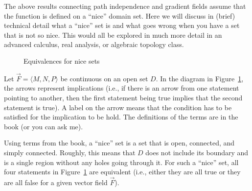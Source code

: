 The above results connecting path independence and gradient fields assume that the function is defined on a ``nice'' domain set.  Here we will discuss in (brief) technical detail what a ``nice'' set is and what goes wrong when you have a set that is not so nice.  This would all be explored in much more detail in an advanced calculus, real analysis, or algebraic topology class.

\begin{figure}[h]
  \centering
  \caption{Equivalences for nice sets}
  \label{fig:equivalences}
\end{figure}


Let $\vec F=\langle M,N,P\rangle$ be continuous on an open set $D$.
In the diagram in Figure~\ref{fig:equivalences}, the arrows represent
implications (i.e., if there is an arrow from one statement pointing
to another, then the first statement being true implies that the
second statement is true).  A label on the arrow means that the
condition has to be satisfied for the implication to be hold.  The
definitions of the terms are in the book (or you can ask me).



Using terms from the book, a ``nice'' set is a set that is open,
connected, and simply connected.  Roughly, this means that $D$ does
not include its boundary and is a single region without any holes going
through it.  For such a ``nice'' set, all four statements in
Figure~\ref{fig:equivalences} are equivalent (i.e., either they are
all true or they are all false for a given vector field $\vec F$).

